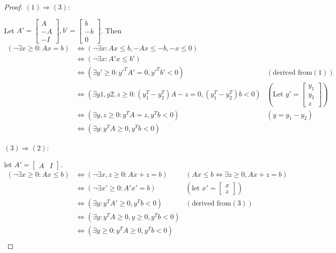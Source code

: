     \begin{proof}
        $(1)\Rightarrow(3)$:

        Let $A'=\left[
        \begin{matrix}
            A \\
            -A \\
            -I
        \end{matrix}
        \right],
        b'=\left[
        \begin{matrix}
            b \\
            -b \\
            0
        \end{matrix}
        \right]$.
        Then \begin{align*}
            (\neg \exists x\ge 0: Ax= b)&\iff(\neg \exists x: Ax\le b,-Ax\le-b,-x\le 0)\\
                                        &\iff(\neg \exists x: A'x\le b') \\
                                        &\iff(\exists y'\ge 0 :y'^{T}A'=0,y'^{T}b'<0) &(\text{derived from} (1))\\
                                        &\iff(\exists y1,y2,z\ge 0:(y_{1}^{T}-y_{2}^{T})A-z=0,(y_{1}^{T}-y_{2}^{T})b<0) &(\text{Let }y'=\left[\begin{matrix} y_1 \\y_2 \\z \end{matrix}\right])\\
                                        &\iff(\exists y,z\ge 0:y^{T}A=z,y^{T}b<0) &(y=y_1-y_2) \\
                                        &\iff(\exists y :y^{T}A\ge 0,y^{T}b<0)
        \end{align*}

        $(3)\Rightarrow(2)$:

        let $A'=\left[
        \begin{matrix}
            A & I
        \end{matrix}
        \right]$.
        \begin{align*}
            (\neg \exists x\ge 0: Ax\le b)&\iff (\neg \exists x,z\ge 0:Ax+z=b) &(Ax\le b \iff \exists z\ge 0,Ax+z=b)\\
                                          &\iff (\neg \exists x'\ge 0:A'x'=b)  &(\text{let }x'=\left[ \begin{matrix} x \\ z\end{matrix} \right])\\
                                          &\iff (\exists y :y^{T}A'\ge 0,y^{T}b<0) &(\text{derived from} (3)) \\
                                          &\iff (\exists y :y^{T}A\ge 0,y\ge 0,y^{T}b<0) \\
                                          &\iff (\exists y\ge 0 :y^{T}A\ge 0,y^{T}b<0) \\
        \end{align*}


\end{proof}
